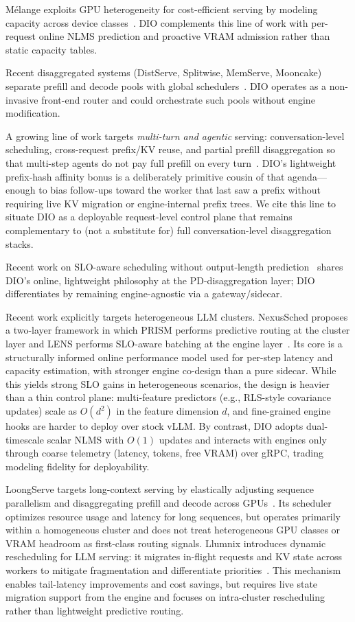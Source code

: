 \documentclass[10pt,twocolumn,letterpaper]{article}
\begin{document}
Mélange exploits GPU heterogeneity for cost-efficient serving by modeling capacity across device classes~\cite{melange}.
DIO complements this line of work with per-request online NLMS prediction and proactive VRAM admission rather than static capacity tables.

Recent disaggregated systems (DistServe, Splitwise, MemServe, Mooncake) separate prefill and decode pools with global schedulers~\cite{distserve,splitwise,memserve,mooncake}.
DIO operates as a non-invasive front-end router and could orchestrate such pools without engine modification.

A growing line of work targets \emph{multi-turn and agentic} serving: conversation-level scheduling, cross-request prefix/KV reuse, and partial prefill disaggregation so that multi-step agents do not pay full prefill on every turn~\cite{sglang,mooncake,memserve,llumnix}.
DIO's lightweight prefix-hash affinity bonus is a deliberately primitive cousin of that agenda---enough to bias follow-ups toward the worker that last saw a prefix without requiring live KV migration or engine-internal prefix trees.
We cite this line to situate DIO as a deployable request-level control plane that remains complementary to (not a substitute for) full conversation-level disaggregation stacks.

Recent work on SLO-aware scheduling without output-length prediction~\cite{sloaware2026} shares DIO's online, lightweight philosophy at the PD-disaggregation layer; DIO differentiates by remaining engine-agnostic via a gateway/sidecar.

Recent work explicitly targets heterogeneous LLM clusters.
NexusSched proposes a two-layer framework in which PRISM performs predictive routing at the cluster layer and LENS performs SLO-aware batching at the engine layer~\cite{nexussched}.
Its core is a structurally informed online performance model used for per-step latency and capacity estimation, with stronger engine co-design than a pure sidecar.
While this yields strong SLO gains in heterogeneous scenarios, the design is heavier than a thin control plane: multi-feature predictors (e.g., RLS-style covariance updates) scale as $O(d^2)$ in the feature dimension $d$, and fine-grained engine hooks are harder to deploy over stock vLLM.
By contrast, DIO adopts dual-timescale scalar NLMS with $O(1)$ updates and interacts with engines only through coarse telemetry (latency, tokens, free VRAM) over gRPC, trading modeling fidelity for deployability.

LoongServe targets long-context serving by elastically adjusting sequence parallelism and disaggregating prefill and decode across GPUs~\cite{loongserve}.
Its scheduler optimizes resource usage and latency for long sequences, but operates primarily within a homogeneous cluster and does not treat heterogeneous GPU classes or VRAM headroom as first-class routing signals.
Llumnix introduces dynamic rescheduling for LLM serving: it migrates in-flight requests and KV state across workers to mitigate fragmentation and differentiate priorities~\cite{llumnix}.
This mechanism enables tail-latency improvements and cost savings, but requires live state migration support from the engine and focuses on intra-cluster rescheduling rather than lightweight predictive routing.
\end{document}
